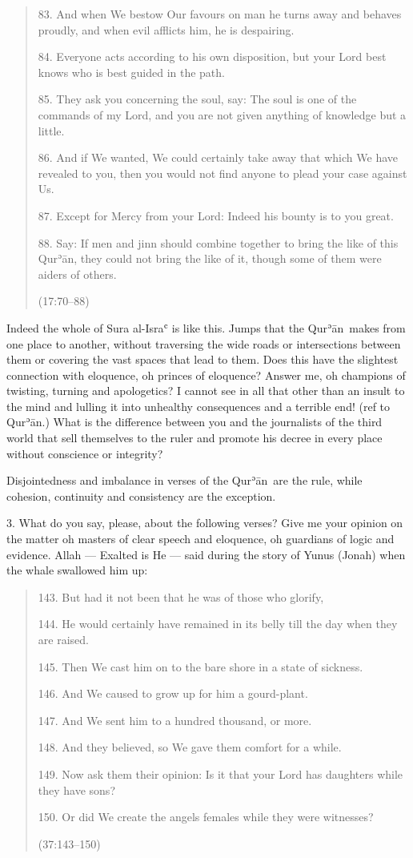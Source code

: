 \documentclass[12pt]{memoir}
\def\´{ʾ} %
\def\`{ʿ} %
\def \Quran{Qur\-\´ān} %
\def\–{-\hskip0pt}
\newcommand{\QRef}[1]{{\color{darkblue}#1}}
\begin{document}
\begin{quote}
83. And when We bestow Our favours on man he turns away and behaves proudly,
and when evil afflicts him, he is despairing.

84. Everyone acts according to his own disposition,
but your Lord best knows who is best guided in the path.

85. They ask you concerning the soul, say:
The soul is one of the commands of my Lord,
and you are not given anything of knowledge but a little.

86. And if We wanted, We could certainly take away
that which We have revealed to you,
then you would not find anyone to plead your case against Us.

87. Except for Mercy from your Lord: Indeed his bounty is to you great.

88. Say: If men and jinn should combine together
to bring the like of this \Quran,
they could not bring the like of it,
though some of them were aiders of others.

(\QRef{17:70–88})
\end{quote}

Indeed the whole of Sura al\–Isra\` is like this.
Jumps that the \Quran\ makes from one place to another,
without traversing the wide roads or intersections between them
or covering the vast spaces that lead to them.
Does this have the slightest connection with eloquence,
oh princes of eloquence?
Answer me, oh champions of twisting, turning and apologetics?
I cannot see in all that other than an insult to the mind
and lulling it into unhealthy consequences and a terrible end!
(ref to \Quran.)\@
What is the difference between you and the journalists of the third world
that sell themselves to the ruler and promote his decree
in every place without conscience or integrity?

Disjointedness and imbalance in verses of the \Quran\ are the rule,
while cohesion, continuity and consistency are the exception.

3. What do you say, please, about the following verses?
Give me your opinion on the matter oh masters of clear speech and eloquence,
oh guardians of logic and evidence.
Allah — Exalted is He — said during the story of Yunus (Jonah)
when the whale swallowed him up:

\begin{quote}
143. But had it not been that he was of those who glorify,

144. He would certainly have remained in its belly
till the day when they are raised.

145. Then We cast him on to the bare shore in a state of sickness.

146. And We caused to grow up for him a gourd\–plant.

147. And We sent him to a hundred thousand, or more.

148. And they believed, so We gave them comfort for a while.

149. Now ask them their opinion:
Is it that your Lord has daughters while they have sons?

150. Or did We create the angels females while they were witnesses?

(\QRef{37:143–150})
\end{quote}
\end{document}
